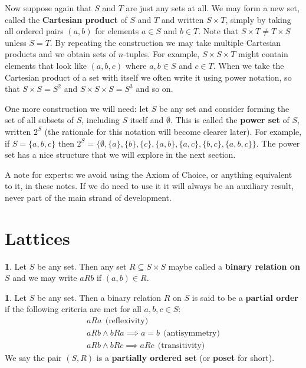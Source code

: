 \documentclass[oneside,english]{amsbook}
\numberwithin{section}{chapter}
\theoremstyle{plain}
\theoremstyle{definition}
\newtheorem{defn}[thm]{\protect\definitionname}
\providecommand{\definitionname}{Definition}
\begin{document}
Now suppose again that $S$ and $T$ are just any sets at all. We may form a new set, called the \textbf{Cartesian product} of $S$ and $T$ and written $S\times T$, simply by taking all ordered pairs $(a,b)$ for elements $a\in S$ and $b\in T$. Note that $S\times T\ne T\times S$ unless $S=T$. By repeating the construction we may take multiple Cartesian products and we obtain sets of $n$-tuples. For example, $S\times S\times T$ might contain elements that look like $(a,b,c)$ where $a,b\in S$ and $c\in T$. When we take the Cartesian product of a set with itself we often write it using power notation, so that $S\times S=S^{2}$ and $S\times S\times S=S^{3}$ and so on.

One more construction we will need: let $S$ be any set and consider forming the set of all subsets of $S$, including $S$ itself and $\emptyset$. This is called the \textbf{power set} of $S$, written $2^{S}$ (the rationale for this notation will become clearer later). For example, if $S=\{a,b,c\}$ then $2^{S}=\{\emptyset,\{a\},\{b\},\{c\},\{a,b\},\{a,c\},\{b,c\},\{a,b,c\}\}$. The power set has a nice structure that we will explore in the next section.

A note for experts: we avoid using the Axiom of Choice, or anything equivalent to it, in these notes. If we do need to use it it will always be an auxiliary result, never part of the main strand of development.

\section{Lattices} 

\begin{defn} 
	Let $S$ be any set. Then any set $R\subseteq S\times S$ maybe called a \textbf{binary relation on $S$} and we may write $aRb$ if $(a,b)\in R$. 
\end{defn}


\begin{defn} 
	Let $S$ be any set. Then a binary relation $R$ on $S$ is said to be a \textbf{partial order }if the following criteria are met for all $a,b,c\in S$: 
	\begin{eqnarray*} 
		aRa\ \ \text{(reflexivity)}\\ 
		aRb\land bRa\implies a=b\ \ \text{(antisymmetry)}\\ 
		aRb\land bRc\implies aRc\ \ \text{(transitivity)} 
	\end{eqnarray*}
	 We say the pair $(S,R)$ is a \textbf{partially ordered set} (or \textbf{poset }for short). 
\end{defn} 
\end{document}
